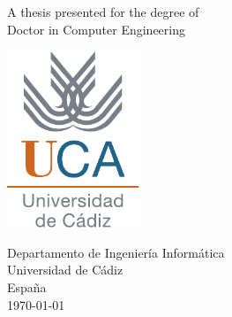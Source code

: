 \begin{titlepage}
\begin{center}
    \vspace*{1cm}
    
    \Huge
    \textbf{\thetitle}
    
    
    \vspace{1.5cm}
    
    \Large
    \textbf{\theauthor}
    
    \vfill
    
    A thesis presented for the degree of \\
    Doctor in Computer Engineering
    
    \vspace{0.8cm}
    \includegraphics[width=0.3\textwidth]{images/uca-logo.pdf}
    
    \vspace{0.5cm}
    
    \large
    Departamento de Ingeniería Informática \\
    Universidad de Cádiz \\
    España \\
    \today
    
\end{center}
\end{titlepage}